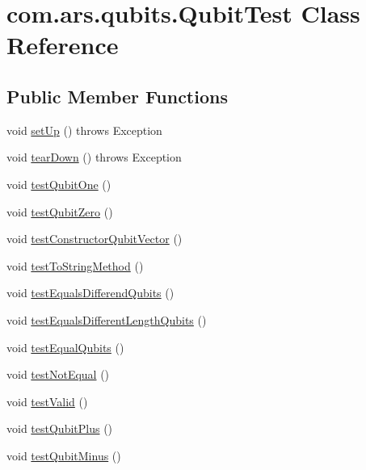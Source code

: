 \hypertarget{classcom_1_1ars_1_1qubits_1_1_qubit_test}{}\section{com.\+ars.\+qubits.\+Qubit\+Test Class Reference}
\label{classcom_1_1ars_1_1qubits_1_1_qubit_test}
\subsection*{Public Member Functions}
\begin{DoxyCompactItemize}
\item 
void \hyperlink{classcom_1_1ars_1_1qubits_1_1_qubit_test_ae68c939221768214df5fb417ef7cf766}{set\+Up} ()  throws Exception 
\item 
void \hyperlink{classcom_1_1ars_1_1qubits_1_1_qubit_test_ade4c555dfc00afb0bf8f8580af8647c9}{tear\+Down} ()  throws Exception 
\item 
void \hyperlink{classcom_1_1ars_1_1qubits_1_1_qubit_test_a2719401cc0f28a3c9676337dca71118d}{test\+Qubit\+One} ()
\item 
void \hyperlink{classcom_1_1ars_1_1qubits_1_1_qubit_test_afd0454df241a37488becb51d06c76f25}{test\+Qubit\+Zero} ()
\item 
void \hyperlink{classcom_1_1ars_1_1qubits_1_1_qubit_test_a47f5f10c10403984398612a0ea940099}{test\+Constructor\+Qubit\+Vector} ()
\item 
void \hyperlink{classcom_1_1ars_1_1qubits_1_1_qubit_test_ae19a6ea1a98159a12bb718310869ff39}{test\+To\+String\+Method} ()
\item 
void \hyperlink{classcom_1_1ars_1_1qubits_1_1_qubit_test_abd3fa46c0aaee3c5c2e617d61e3f8d30}{test\+Equals\+Differend\+Qubits} ()
\item 
void \hyperlink{classcom_1_1ars_1_1qubits_1_1_qubit_test_a709c83a9267630746e57b0903ad53c41}{test\+Equals\+Different\+Length\+Qubits} ()
\item 
void \hyperlink{classcom_1_1ars_1_1qubits_1_1_qubit_test_a260e01e74869bf75442e06872921b91c}{test\+Equal\+Qubits} ()
\item 
void \hyperlink{classcom_1_1ars_1_1qubits_1_1_qubit_test_a399fda391bd4201af1d625d3beb8e1fd}{test\+Not\+Equal} ()
\item 
void \hyperlink{classcom_1_1ars_1_1qubits_1_1_qubit_test_add210bf06395e140f80609f097df4a2c}{test\+Valid} ()
\item 
void \hyperlink{classcom_1_1ars_1_1qubits_1_1_qubit_test_a389dff5ee932a806b76703b63b60e3d9}{test\+Qubit\+Plus} ()
\item 
void \hyperlink{classcom_1_1ars_1_1qubits_1_1_qubit_test_a911234a4c70ada90102877f163e3b973}{test\+Qubit\+Minus} ()
\end{DoxyCompactItemize}


